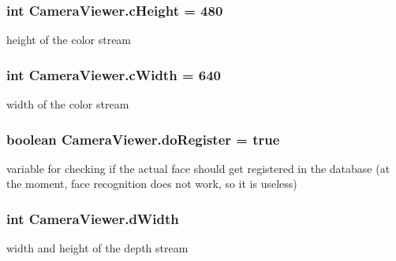 \subsubsection[{\texorpdfstring{c\+Height}{cHeight}}]{\setlength{\rightskip}{0pt plus 5cm}int Camera\+Viewer.\+c\+Height = 480\hspace{0.3cm}{\ttfamily [static]}}\hypertarget{class_camera_viewer_af02b7d67aab1dc9cabf2a878fb8a0f85}{}\label{class_camera_viewer_af02b7d67aab1dc9cabf2a878fb8a0f85}
height of the color stream 
\subsubsection[{\texorpdfstring{c\+Width}{cWidth}}]{\setlength{\rightskip}{0pt plus 5cm}int Camera\+Viewer.\+c\+Width = 640\hspace{0.3cm}{\ttfamily [static]}}\hypertarget{class_camera_viewer_a8d9edb173e94f793e357f75110536d2a}{}\label{class_camera_viewer_a8d9edb173e94f793e357f75110536d2a}
width of the color stream 
\subsubsection[{\texorpdfstring{do\+Register}{doRegister}}]{\setlength{\rightskip}{0pt plus 5cm}boolean Camera\+Viewer.\+do\+Register = true\hspace{0.3cm}{\ttfamily [static]}}\hypertarget{class_camera_viewer_a5435323d8b24dad1767ef81de2a72d60}{}\label{class_camera_viewer_a5435323d8b24dad1767ef81de2a72d60}
variable for checking if the actual face should get registered in the database (at the moment, face recognition does not work, so it is useless) 
\subsubsection[{\texorpdfstring{d\+Width}{dWidth}}]{\setlength{\rightskip}{0pt plus 5cm}int Camera\+Viewer.\+d\+Width\hspace{0.3cm}{\ttfamily [static]}}\hypertarget{class_camera_viewer_aded50825f5d1ea9c745c75a55e4a105d}{}\label{class_camera_viewer_aded50825f5d1ea9c745c75a55e4a105d}
width and height of the depth stream 
